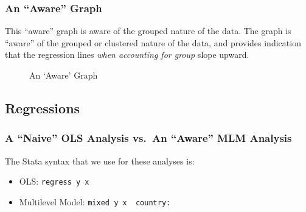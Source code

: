 \documentclass[
  letterpaper,
  DIV=11,
  numbers=noendperiod]{scrreprt}
\providecommand{\tightlist}{%
  \setlength{\itemsep}{0pt}\setlength{\parskip}{0pt}}\usepackage{longtable,booktabs,array}
\begin{document}
\subsubsection{An ``Aware'' Graph}\label{an-aware-graph}

This ``aware'' graph is aware of the grouped nature of the data. The
graph is ``aware'' of the grouped or clustered nature of the data, and
provides indication that the regression lines \emph{when accounting for
group} slope upward.

\begin{figure}


\caption{\label{fig-aware}An `Aware' Graph}

\end{figure}%

\subsection{Regressions}\label{regressions}

\subsubsection{A ``Naive'' OLS Analysis vs.~An ``Aware'' MLM
Analysis}\label{a-naive-ols-analysis-vs.-an-aware-mlm-analysis}

The Stata syntax that we use for these analyses is:

\begin{itemize}
\tightlist
\item
  OLS: \texttt{regress\ y\ x}
\item
  Multilevel Model: \texttt{mixed\ y\ x\ \textbar{}\textbar{}\ country:}
\end{itemize}
\end{document}
